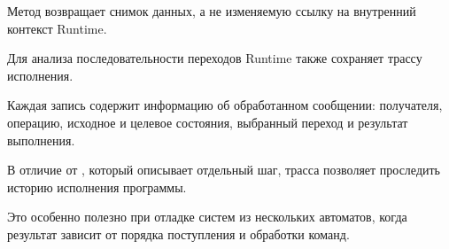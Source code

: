 Метод возвращает снимок данных, а не изменяемую
ссылку на внутренний контекст Runtime.

Для анализа последовательности переходов
Runtime также сохраняет трассу исполнения.

Каждая запись  содержит информацию
об обработанном сообщении: получателя, операцию,
исходное и целевое состояния, выбранный переход
и результат выполнения.

В отличие от , который описывает
отдельный шаг, трасса позволяет проследить историю
исполнения программы.

Это особенно полезно при отладке систем из нескольких
автоматов, когда результат зависит от порядка
поступления и обработки команд.
